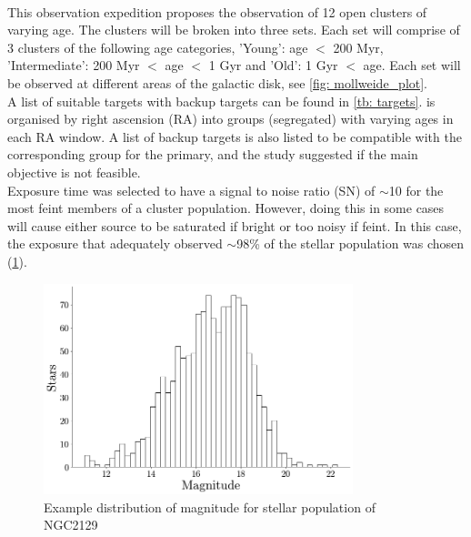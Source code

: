 %
%
% 
%
\smallskip
{}
\smallskip\\
This observation expedition proposes the observation of 12 open clusters of varying age. The clusters will be broken into three sets. Each set will comprise of 3 clusters of the following age categories, 'Young': age $<$ 200 Myr, 'Intermediate': 200 Myr $<$ age $<$ 1 Gyr and 'Old': 1 Gyr $<$ age. Each set will be observed at different areas of the galactic disk, see \cref{fig: mollweide_plot}. \\ A list of suitable targets with backup targets can be found in \cref{tb: targets}.  is organised by right ascension (RA) into groups (segregated) with varying ages in each RA window. A list of backup targets is also listed to be compatible with the corresponding group for the primary, and the study suggested if the main objective is not feasible. \\ Exposure time was selected to have a signal to noise ratio (SN) of $\sim$10 for the most feint members of a cluster population. However, doing this in some cases will cause either source to be saturated if bright or too noisy if feint. In this case, the exposure that adequately observed $\sim$98\% of the stellar population was chosen (\cref{fig: hist_plot}).
\begin{figure}[h!]
    \centering
    \includegraphics[width = 9cm]{figs/histogram.png}
    \caption{Example distribution of magnitude for stellar population of NGC2129}
    \label{fig: hist_plot}
\end{figure}



